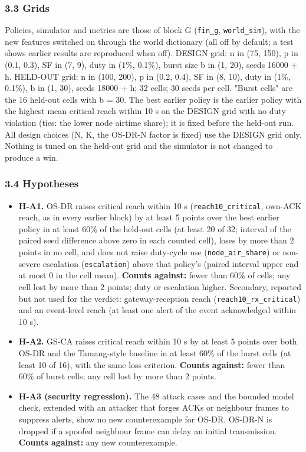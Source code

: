 \subsubsection*{3.3 Grids}
Policies, simulator and metrics are those of block G (\texttt{fin\_g}, \texttt{world\_sim}), with the new features switched on through the world dictionary (all off by default; a test shows earlier results are reproduced when off). DESIGN grid: n in (75, 150), p in (0.1, 0.3), SF in (7, 9), duty in (1\%, 0.1\%), burst size b in (1, 20), seeds 16000 + h. HELD-OUT grid: n in (100, 200), p in (0.2, 0.4), SF in (8, 10), duty in (1\%, 0.1\%), b in (1, 30), seeds 18000 + h; 32 cells; 30 seeds per cell. "Burst cells" are the 16 held-out cells with b = 30. The best earlier policy is the earlier policy with the highest mean critical reach within 10 s on the DESIGN grid with no duty violation (ties: the lower node airtime share); it is fixed before the held-out run. All design choices (N, K, the OS-DR-N factor is fixed) use the DESIGN grid only. Nothing is tuned on the held-out grid and the simulator is not changed to produce a win.

\subsubsection*{3.4 Hypotheses}
\begin{itemize}
\item \textbf{H-A1.} OS-DR raises critical reach within 10 s (\texttt{reach10\_critical}, own-ACK reach, as in every earlier block) by at least 5 points over the best earlier policy in at least 60\% of the held-out cells (at least 20 of 32; interval of the paired seed difference above zero in each counted cell), loses by more than 2 points in no cell, and does not raise duty-cycle use (\texttt{node\_air\_share}) or non-severe escalation (\texttt{escalation}) above that policy's (paired interval upper end at most 0 in the cell mean). \textbf{Counts against:} fewer than 60\% of cells; any cell lost by more than 2 points; duty or escalation higher. Secondary, reported but not used for the verdict: gateway-reception reach (\texttt{reach10\_rx\_critical}) and an event-level reach (at least one alert of the event acknowledged within 10 s).
\item \textbf{H-A2.} GS-CA raises critical reach within 10 s by at least 5 points over both OS-DR and the Tamang-style baseline in at least 60\% of the burst cells (at least 10 of 16), with the same loss criterion. \textbf{Counts against:} fewer than 60\% of burst cells; any cell lost by more than 2 points.
\item \textbf{H-A3 (security regression).} The 48 attack cases and the bounded model check, extended with an attacker that forges ACKs or neighbour frames to suppress alerts, show no new counterexample for OS-DR. OS-DR-N is dropped if a spoofed neighbour frame can delay an initial transmission. \textbf{Counts against:} any new counterexample.
\end{itemize}

